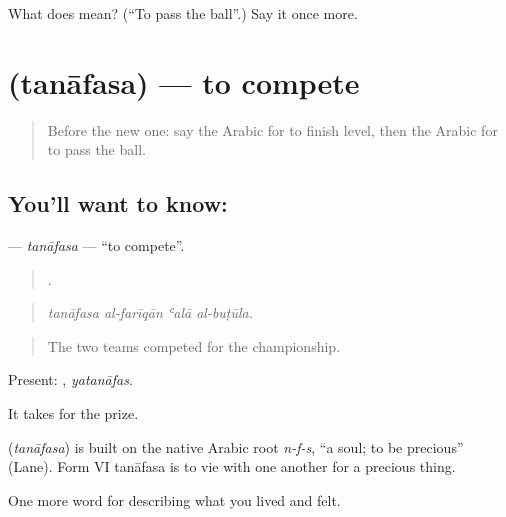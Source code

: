 \begin{tcolorbox}[breakable,colback=teal!4,colframe=teal!35!black,title={Before you move on}]
What does  mean? (\textquotedblleft{}To pass the ball\textquotedblright{}.) Say it once more.
\end{tcolorbox}
\section[\texorpdfstring{\ar{تنافس} (tanāfasa)}{تنافس (tanāfasa)}]{ (tanāfasa) — to compete}

\label{lesson:AR-C546-tanafasa}



\begin{quote}
Before the new one: say the Arabic for to finish level, then the Arabic for to pass the ball.
\end{quote}

\subsection*{You'll want to know: }
\textbf{} — \emph{tanāfasa} — \textquotedblleft{}to compete\textquotedblright{}.

\begin{quote}
   .
\end{quote}

\begin{quote}
\emph{tanāfasa al-farīqān ʿalā al-buṭūla.}
\end{quote}

\begin{quote}
The two teams competed for the championship.
\end{quote}

Present: , \emph{yatanāfas}.

It takes  for the prize.

\begin{cousinweb}
\textbf{} (\emph{tanāfasa}) is built on the native Arabic root \emph{n-f-s}, \textquotedblleft{}a soul; to be precious\textquotedblright{} (Lane). Form VI tanāfasa is to vie with one another for a precious thing.
\end{cousinweb}

\begin{grammarlens}[title={What you've built}]
One more word for describing what you lived and felt.
\end{grammarlens}

